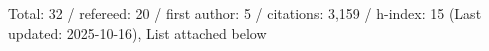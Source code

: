 Total: 32 / refereed: 20 / first author: 5 / citations: 3,159 / h-index: 15 (Last updated: 2025-10-16), List attached below